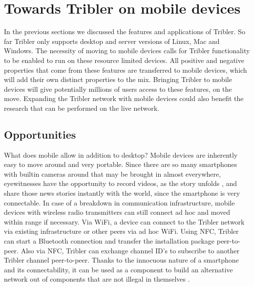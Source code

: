 \section{Towards Tribler on mobile devices}\label{ch:tribler_mobile}
In the previous sections we discussed the features and applications of Tribler.
So far Tribler only supports desktop and server versions of Linux, Mac and Windows.
The necessity of moving to mobile devices calls for Tribler functionality to be enabled to run on these resource limited devices.
All positive and negative properties that come from these features are transferred to mobile devices, which will add their own distinct properties to the mix.
Bringing Tribler to mobile devices will give potentially millions of users access to these features, on the move.
Expanding the Tribler network with mobile devices could also benefit the research that can be performed on the live network.



\subsection{Opportunities}
What does mobile allow in addition to desktop?
Mobile devices are inherently easy to move around and very portable.
Since there are so many smartphones with builtin cameras around that may be brought in almost everywhere, eyewitnesses have the opportunity to record videos, as the story unfolds \cite{news_crowd}, and share those news stories instantly with the world, since the smartphone is very connectable.
In case of a breakdown in communication infrastructure, mobile devices with wireless radio transmitters can still connect ad hoc and moved within range if necessary.
Via WiFi, a device can connect to the Tribler network via existing infrastructure or other peers via ad hoc WiFi.
Using NFC, Tribler can start a Bluetooth connection and transfer the installation package peer-to-peer.
Also via NFC, Tribler can exchange channel ID's to subscribe to another Tribler channel peer-to-peer.
Thanks to the  innocuous nature of a smartphone and its connectability, it can be used as a component to build an alternative network out of components that are not illegal in themselves \cite{hasan2013dissent}.


